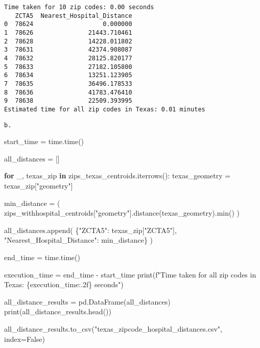 \documentclass[
  letterpaper,
  DIV=11,
  numbers=noendperiod]{scrartcl}
\newenvironment{Shaded}{\begin{snugshade}}{\end{snugshade}}
\newcommand{\BuiltInTok}[1]{\textcolor[rgb]{0.00,0.23,0.31}{#1}}
\newcommand{\ControlFlowTok}[1]{\textcolor[rgb]{0.00,0.23,0.31}{\textbf{#1}}}
\newcommand{\KeywordTok}[1]{\textcolor[rgb]{0.00,0.23,0.31}{\textbf{#1}}}
\newcommand{\NormalTok}[1]{\textcolor[rgb]{0.00,0.23,0.31}{#1}}
\newcommand{\OperatorTok}[1]{\textcolor[rgb]{0.37,0.37,0.37}{#1}}
\newcommand{\SpecialCharTok}[1]{\textcolor[rgb]{0.37,0.37,0.37}{#1}}
\newcommand{\SpecialStringTok}[1]{\textcolor[rgb]{0.13,0.47,0.30}{#1}}
\newcommand{\StringTok}[1]{\textcolor[rgb]{0.13,0.47,0.30}{#1}}
\newcommand{\VariableTok}[1]{\textcolor[rgb]{0.07,0.07,0.07}{#1}}
\begin{document}
\begin{verbatim}
Time taken for 10 zip codes: 0.00 seconds
   ZCTA5  Nearest_Hospital_Distance
0  78624                   0.000000
1  78626               21443.710461
2  78628               14228.011802
3  78631               42374.908087
4  78632               28125.820177
5  78633               27182.105800
6  78634               13251.123905
7  78635               36496.178533
8  78636               41783.476410
9  78638               22509.393995
Estimated time for all zip codes in Texas: 0.01 minutes
\end{verbatim}

\begin{verbatim}
b.
\end{verbatim}

\begin{Shaded}
\begin{Highlighting}[]
\NormalTok{start\_time }\OperatorTok{=}\NormalTok{ time.time()}

\NormalTok{all\_distances }\OperatorTok{=}\NormalTok{ []}

\ControlFlowTok{for}\NormalTok{ \_, texas\_zip }\KeywordTok{in}\NormalTok{ zips\_texas\_centroids.iterrows():}
\NormalTok{    texas\_geometry }\OperatorTok{=}\NormalTok{ texas\_zip[}\StringTok{"geometry"}\NormalTok{]}

\NormalTok{    min\_distance }\OperatorTok{=}\NormalTok{ (}
\NormalTok{        zips\_withhospital\_centroids[}\StringTok{"geometry"}\NormalTok{].distance(texas\_geometry).}\BuiltInTok{min}\NormalTok{()}
\NormalTok{    )}

\NormalTok{    all\_distances.append(}
\NormalTok{        \{}\StringTok{"ZCTA5"}\NormalTok{: texas\_zip[}\StringTok{"ZCTA5"}\NormalTok{], }\StringTok{"Nearest\_Hospital\_Distance"}\NormalTok{: min\_distance\}}
\NormalTok{    )}

\NormalTok{end\_time }\OperatorTok{=}\NormalTok{ time.time()}

\NormalTok{execution\_time }\OperatorTok{=}\NormalTok{ end\_time }\OperatorTok{{-}}\NormalTok{ start\_time}
\BuiltInTok{print}\NormalTok{(}\SpecialStringTok{f"Time taken for all zip codes in Texas: }\SpecialCharTok{\{}\NormalTok{execution\_time}\SpecialCharTok{:.2f\}}\SpecialStringTok{ seconds"}\NormalTok{)}

\NormalTok{all\_distance\_results }\OperatorTok{=}\NormalTok{ pd.DataFrame(all\_distances)}
\BuiltInTok{print}\NormalTok{(all\_distance\_results.head())}

\NormalTok{all\_distance\_results.to\_csv(}\StringTok{"texas\_zipcode\_hospital\_distances.csv"}\NormalTok{, index}\OperatorTok{=}\VariableTok{False}\NormalTok{)}


\end{Highlighting}
\end{Shaded}
\end{document}
